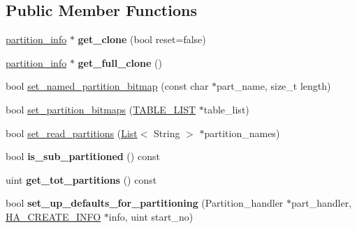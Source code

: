 \subsection*{Public Member Functions}
\begin{DoxyCompactItemize}
\item 
\mbox{\label{classpartition__info_a34c0ee21d55eddccfc31b01922f88c2c}} 
\mbox{\hyperlink{classpartition__info}{partition\+\_\+info}} $\ast$ {\bfseries get\+\_\+clone} (bool reset=false)
\item 
\mbox{\label{classpartition__info_ac675c4b204fbbdb5fe67bf9f539adbf0}} 
\mbox{\hyperlink{classpartition__info}{partition\+\_\+info}} $\ast$ {\bfseries get\+\_\+full\+\_\+clone} ()
\item 
bool \mbox{\hyperlink{classpartition__info_ae85efb249bbcbe50f9ab3a77c120baae}{set\+\_\+named\+\_\+partition\+\_\+bitmap}} (const char $\ast$part\+\_\+name, size\+\_\+t length)
\item 
bool \mbox{\hyperlink{classpartition__info_a2d9a2052edfc8a92e7fc432de99dcdfb}{set\+\_\+partition\+\_\+bitmaps}} (\mbox{\hyperlink{structTABLE__LIST}{T\+A\+B\+L\+E\+\_\+\+L\+I\+ST}} $\ast$table\+\_\+list)
\item 
bool \mbox{\hyperlink{classpartition__info_aa0f0326670ced67fb5eb07101467c9e1}{set\+\_\+read\+\_\+partitions}} (\mbox{\hyperlink{classList}{List}}$<$ String $>$ $\ast$partition\+\_\+names)
\item 
\mbox{\label{classpartition__info_aa90fc74aaab23046ab0144e99ab5a9ee}} 
bool {\bfseries is\+\_\+sub\+\_\+partitioned} () const
\item 
\mbox{\label{classpartition__info_aa328d88e86b77cd4b077274a9181c199}} 
uint {\bfseries get\+\_\+tot\+\_\+partitions} () const
\item 
\mbox{\label{classpartition__info_a6cdf663baa8f7e1846abb8b50f06ab95}} 
bool {\bfseries set\+\_\+up\+\_\+defaults\+\_\+for\+\_\+partitioning} (Partition\+\_\+handler $\ast$part\+\_\+handler, \mbox{\hyperlink{structst__ha__create__information}{H\+A\+\_\+\+C\+R\+E\+A\+T\+E\+\_\+\+I\+N\+FO}} $\ast$info, uint start\+\_\+no)
\item 
\mbox{\label{classpartition__info_a67f5f9500fd5a61a72cbaca0b87c90f4}} 

\end{DoxyCompactItemize}
